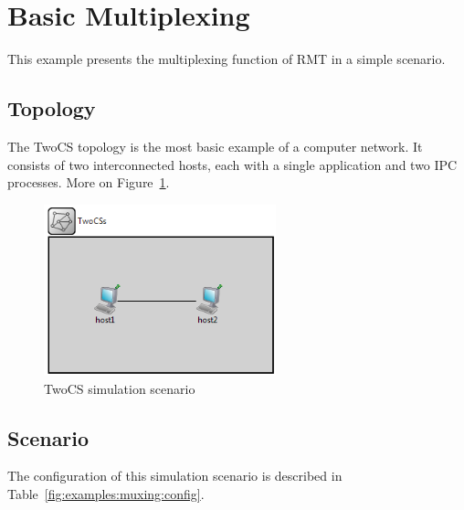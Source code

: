     \section{Basic Multiplexing}

        This example presents the multiplexing function of RMT in a simple scenario.

        \subsection{Topology}

            The TwoCS topology is the most basic example of a computer network. It consists of two interconnected hosts, each with a single application and two IPC processes. More on Figure~\ref{fig:examples:muxing:events:topology}.

            \begin{figure}[H]
                \begin{center}
                    \includegraphics[width=0.6\textwidth]{fig/examples-twocs.png}
                  \caption{TwoCS simulation scenario}
                  \label{fig:examples:muxing:events:topology}
                \end{center}
            \end{figure}

        \subsection{Scenario}

            The configuration of this simulation scenario is described in Table~\ref{fig:examples:muxing:config}.


